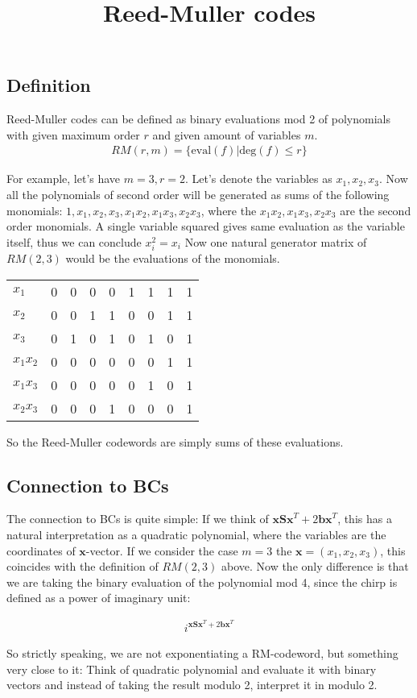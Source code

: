 \documentclass{article}
\title{Reed-Muller codes}
\begin{document}
\maketitle
\subsection*{Definition}

Reed-Muller codes can be defined as binary evaluations mod 2 of polynomials with given maximum order $r$ and given amount of variables $m$.
\begin{align*}
RM(r,m) = \{\text{eval}(f) | \text{deg}(f) \leq r \}
\end{align*}

For example, let's have $m=3, r=2$. Let's denote the variables as $x_1, x_2, x_3$.
Now all the polynomials of second order will be generated as sums of the following monomials:
$1, x_1, x_2, x_3, x_1x_2, x_1x_3, x_2x_3$, where the $x_1x_2, x_1x_3, x_2x_3$ are the second order monomials. A single variable squared gives same evaluation as the variable itself, thus we can conclude $x_i^2 = x_i$
Now one natural generator matrix of $RM(2,3)$ would be the evaluations of the monomials.

\begin{table}[h]
	\begin{tabular}{lllllllll}
		$x_1$     & 0 & 0 & 0 & 0 & 1 & 1 & 1 & 1 \\
		$x_2$     & 0 & 0 & 1 & 1 & 0 & 0 & 1 & 1 \\
		$x_3$     & 0 & 1 & 0 & 1 & 0 & 1 & 0 & 1 \\
		$x_1x_2$ & 0 & 0 & 0 & 0 & 0 & 0 & 1 & 1 \\
		$x_1x_3$ & 0 & 0 & 0 & 0 & 0 & 1 & 0 & 1 \\
		$x_2x_3$ & 0 & 0 & 0 & 1 & 0 & 0 & 0 & 1
	\end{tabular}
\end{table}

So the Reed-Muller codewords are simply sums of these evaluations. 

\subsection*{Connection to BCs}

The connection to BCs is quite simple: If we think of $\mathbf{xSx}^T + 2\mathbf{bx}^T$, this has a natural interpretation as a quadratic polynomial, where the variables are the coordinates of $\mathbf{x}$-vector. If we consider the case $m=3$ the $\mathbf{x}=(x_1,x_2,x_3)$, this coincides with the definition of $RM(2,3)$ above. Now the only difference is that we are taking the binary evaluation of the polynomial mod 4, since the chirp is defined as a power of imaginary unit:

\begin{align*}
	i^{\mathbf{xSx}^T+2\mathbf{bx}^T}
\end{align*}

So strictly speaking, we are not exponentiating a RM-codeword, but something very close to it: Think of quadratic polynomial and evaluate it with binary vectors and instead of taking the result modulo 2, interpret it in modulo 2.
\end{document}
